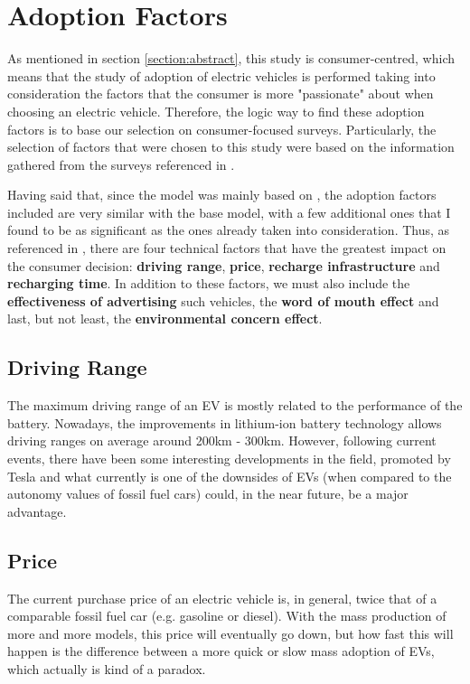 \section{Adoption Factors} \label{section:factors}
As mentioned in section \ref{section:abstract}, this study is consumer-centred, which means that the study of adoption of electric vehicles is performed taking into consideration the factors that the consumer is more "passionate" about when choosing an electric vehicle. Therefore, the logic way to find these adoption factors is to base our selection on consumer-focused surveys. Particularly, the selection of factors that were chosen to this study were based on the information gathered from the surveys referenced in \cite{thesis-base, yue-xiang-paper}.

Having said that, since the model was mainly based on \cite{thesis-base}, the adoption factors included are very similar with the base model, with a few additional ones that I found to be as significant as the ones already taken into consideration. Thus, as referenced in \cite{thesis-base}, there are four technical factors that have the greatest impact on the consumer decision: \textbf{driving range}, \textbf{price}, \textbf{recharge infrastructure} and \textbf{recharging time}. In addition to these factors, we must also include the \textbf{effectiveness of advertising} such vehicles, the \textbf{word of mouth effect} and last, but not least, the \textbf{environmental concern effect}.

\subsection{Driving Range}
The maximum driving range of an EV is mostly related to the performance of the battery. Nowadays, the improvements in lithium-ion battery technology allows driving ranges on average around 200km - 300km. However, following current events, there have been some interesting developments in the field, promoted by Tesla and what currently is one of the downsides of EVs (when compared to the autonomy values of fossil fuel cars) could, in the near future, be a major advantage.

\subsection{Price}
The current purchase price of an electric vehicle is, in general, twice that of a comparable fossil fuel car (e.g. gasoline or diesel). With the mass production of more and more models, this price will eventually go down, but how fast this will happen is the difference between a more quick or slow mass adoption of EVs, which actually is kind of a paradox.

